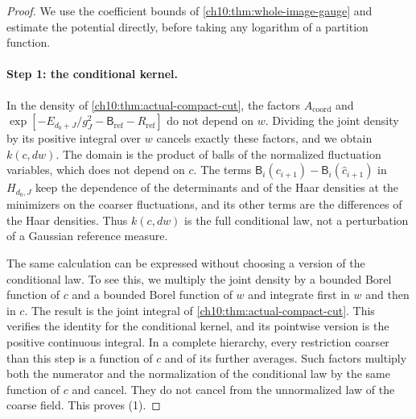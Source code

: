 \begin{proof}
We use the coefficient bounds of \cref{ch10:thm:whole-image-gauge} and estimate the potential directly, before taking any logarithm of a partition function.

\paragraph{Step 1: the conditional kernel.}
In the density of \cref{ch10:thm:actual-compact-cut}, the factors $A_{\mathrm{coord}}$ and $\exp[-E_{d_0+J}/g_J^2-\mathsf B_{\mathrm{ref}}-R_{\mathrm{ref}}]$ do not depend on $w$. Dividing the joint density by its positive integral over $w$ cancels exactly these factors, and we obtain $k(c,dw)$. The domain is the product of balls of the normalized fluctuation variables, which does not depend on $c$. The terms $\mathsf B_i(c_{i+1})-\mathsf B_i(\widehat c_{i+1})$ in $H_{d_0,J}$ keep the dependence of the determinants and of the Haar densities at the minimizers on the coarser fluctuations, and its other terms are the differences of the Haar densities. Thus $k(c,dw)$ is the full conditional law, not a perturbation of a Gaussian reference measure.

The same calculation can be expressed without choosing a version of the conditional law. To see this, we multiply the joint density by a bounded Borel function of $c$ and a bounded Borel function of $w$ and integrate first in $w$ and then in $c$. The result is the joint integral of \cref{ch10:thm:actual-compact-cut}. This verifies the identity for the conditional kernel, and its pointwise version is the positive continuous integral. In a complete hierarchy, every restriction coarser than this step is a function of $c$ and of its further averages. Such factors multiply both the numerator and the normalization of the conditional law by the same function of $c$ and cancel. They do not cancel from the unnormalized law of the coarse field. This proves (1).


\end{proof}
